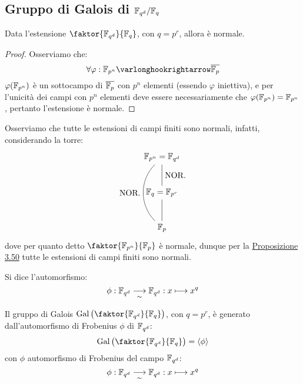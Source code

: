 \documentclass[11pt]{scrartcl}
\begin{document}
\newpage
\subsection{Gruppo di Galois di $\mathbb{F}_{q^d}/\mathbb{F}_{q}$}

\begin{proposition}
    Data l'estensione $\faktor{\F{q^d}}{\F{q}}$, con $q = p^r$, allora è normale.
\end{proposition}

\begin{proof}
    Osserviamo che:
    \[ \forall \varphi : \Fpn \varlonghookrightarrow \overline \Fp
        \]
    $\varphi(\mathbb{F}_{p^{n}})$ è un sottocampo di $\overline{{\mathbb F}_p}$ con $p^n$ elementi (essendo $\varphi$ iniettiva), e per l'unicità dei campi con $p^n$ elementi deve essere necessariamente che $\varphi(\mathbb{F}_{p^{n}}) = \mathbb{F}_{p^{n}}$,
    pertanto l'estensione è normale.
\end{proof}

\begin{remark}
    Osserviamo che tutte le estensioni di campi finiti sono normali, infatti, considerando la torre:
    \[\begin{tikzpicture}
        \node (Q1) at (0,-1.5) {$\Fp$};
        \node (Q3) at (0,0) {$\F{q} = \F{p^r}$};
        \node (Q4) at (0,1.5) {$\Fpn = \F{q^d}$};
        \draw (Q4)--(Q3) node [right, yshift=-0.75cm] {};
        \draw (Q1)--(Q3) node [right, yshift=0.75cm] {NOR.};
        \draw(Q4) to [bend right=45] (Q1) node[left, yshift=1.20cm, xshift=-0.5cm] {NOR.};
    \end{tikzpicture}
        \]
    dove per quanto detto $\faktor{\Fpn}{\Fp}$ è normale, dunque per la \hyperref[3.50]{Proposizione 3.50} tutte le estensioni di campi finiti sono normali.
\end{remark}

\begin{definition}
    Si dice  l'automorfismo:
    \[ \phi : \mathbb{F}_{q^d} \underset{\sim}{\longrightarrow} \mathbb{F}_{q^d} : x \longmapsto x^q
        \]
\end{definition}

\begin{theorem}
    Il gruppo di Galois $\Gal\left(\faktor{\F{q^d}}{\F{q}}\right)$, con $q = p^r$, è generato dall'automorfismo di Frobenius $\phi$ di $\mathbb{F}_{q^d}$:
    \[ \Gal\left(\faktor{\F{q^d}}{\F{q}}\right) = \left<\phi\right>
        \]
    con $\phi$ automorfismo di Frobenius del campo $\mathbb{F}_{q^d}$:
    \[ \phi : \mathbb{F}_{q^d} \underset{\sim}{\longrightarrow} \mathbb{F}_{q^d} : x \longmapsto x^q
        \]
\end{theorem}
\end{document}
